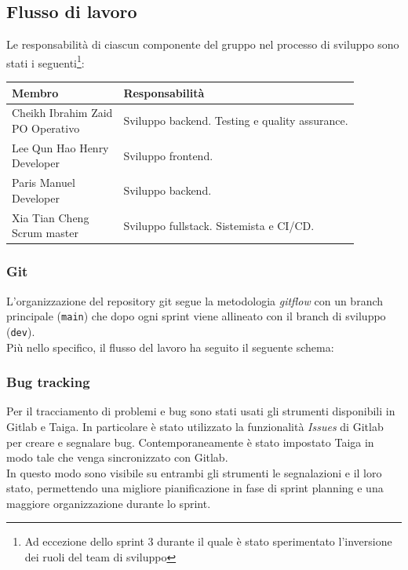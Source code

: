 \documentclass[11pt]{article}
\begin{document}
\subsection{Flusso di lavoro}
Le responsabilità di ciascun componente del gruppo nel processo di sviluppo sono stati i 
seguenti\footnote{Ad eccezione dello sprint 3 durante il quale è stato sperimentato l'inversione dei ruoli del team di sviluppo}:
\begin{center}
    \begin{tabular}{ | m{4cm} | m{10cm} | }
        \hline
        {\textbf{Membro}} & {\textbf{Responsabilità}} \\
        \hline
        \makecell[cl]{Cheikh Ibrahim Zaid\\{\footnotesize PO Operativo}} & Sviluppo backend. Testing e quality assurance. \\ 
        \hline
        \makecell[cl]{Lee Qun Hao Henry\\{\footnotesize Developer}} & Sviluppo frontend. \\ 
        \hline
        \makecell[cl]{Paris Manuel\\{\footnotesize Developer}} & Sviluppo backend. \\ 
        \hline
        \makecell[cl]{Xia Tian Cheng\\{\footnotesize Scrum master}} & Sviluppo fullstack. Sistemista e CI/CD. \\ 
        \hline
    \end{tabular}
\end{center}

\subsubsection{Git}
L'organizzazione del repository git segue la metodologia \textit{gitflow} con un branch principale (\texttt{main}) che dopo ogni sprint viene allineato
con il branch di sviluppo (\texttt{dev}).\\
Più nello specifico, il flusso del lavoro ha seguito il seguente schema:


\subsubsection{Bug tracking}
Per il tracciamento di problemi e bug sono stati usati gli strumenti disponibili in Gitlab e Taiga.
In particolare è stato utilizzato la funzionalità \textit{Issues} di Gitlab per creare e segnalare bug. 
Contemporaneamente è stato impostato Taiga in modo tale che venga sincronizzato con Gitlab.\\
In questo modo sono visibile su entrambi gli strumenti le segnalazioni e il loro stato, permettendo una migliore pianificazione in fase di sprint planning e
una maggiore organizzazione durante lo sprint.
\end{document}
